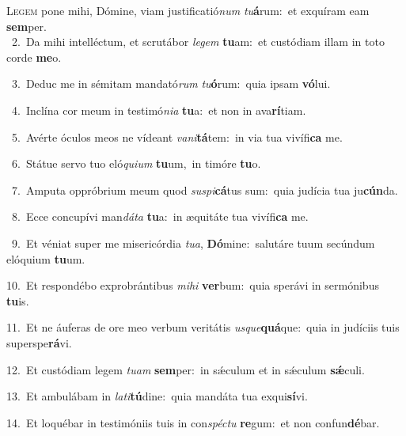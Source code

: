 \lettrine{\initial\textcolor{\initialcolor}{L}}{egem} pone mihi, Dómine, viam justificatió\textit{num} \textit{tu}\-\textbf{á}rum:~\star et exquíram eam \textbf{sem}\-per.\\
{\numbfont\textcolor{\numbcolor}{~2.}}~Da mihi intelléctum, et scrutábor \textit{le}\-\textit{gem} \textbf{tu}\-am:~\star et custódiam illam in toto corde \textbf{me}\-o.\par
{\numbfont\textcolor{\numbcolor}{~3.}}~Deduc me in sémitam mandató\textit{rum} \textit{tu}\-\textbf{ó}rum:~\star quia ipsam \textbf{vó}\-lui.\par
{\numbfont\textcolor{\numbcolor}{~4.}}~Inclína cor meum in testimó\-\textit{ni}\-\textit{a} \textbf{tu}\-a:~\star et non in ava\-\textbf{rí}\-tiam.\par
{\numbfont\textcolor{\numbcolor}{~5.}}~Avérte óculos meos ne vídeant \textit{va}\-\textit{ni}\textbf{tá}tem:~\star in via tua vivífi\textbf{ca} me.\par
{\numbfont\textcolor{\numbcolor}{~6.}}~Státue servo tuo eló\-\textit{qui}\-\textit{um} \textbf{tu}\-um,~\star in timóre \textbf{tu}\-o.\par
{\numbfont\textcolor{\numbcolor}{~7.}}~Amputa oppróbrium meum quod \textit{su}\-\textit{spi}\textbf{cá}tus sum:~\star quia judícia tua ju\-\textbf{cún}\-da.\par
{\numbfont\textcolor{\numbcolor}{~8.}}~Ecce concupívi man\-\textit{dá}\-\textit{ta} \textbf{tu}\-a:~\star in æquitáte tua vivífi\textbf{ca} me.\par
{\numbfont\textcolor{\numbcolor}{~9.}}~Et véniat super me misericórdia \textit{tu}\-\textit{a}, \textbf{Dó}\-mine:~\star salutáre tuum secúndum elóquium \textbf{tu}\-um.\par
{\numbfont\textcolor{\numbcolor}{10.}}~Et respondébo exprobrántibus \textit{mi}\-\textit{hi} \textbf{ver}\-bum:~\star quia sperávi in sermónibus \textbf{tu}\-is.\par
{\numbfont\textcolor{\numbcolor}{11.}}~Et ne áuferas de ore meo verbum veritátis \textit{us}\-\textit{que}\textbf{quá}que:~\star quia in judíciis tuis superspe\-\textbf{rá}\-vi.\par
{\numbfont\textcolor{\numbcolor}{12.}}~Et custódiam legem \textit{tu}\-\textit{am} \textbf{sem}\-per:~\star in sǽculum et in sǽculum \textbf{sǽ}\-culi.\par
{\numbfont\textcolor{\numbcolor}{13.}}~Et ambulábam in \textit{la}\-\textit{ti}\textbf{tú}dine:~\star quia mandáta tua exqui\-\textbf{sí}\-vi.\par
{\numbfont\textcolor{\numbcolor}{14.}}~Et loquébar in testimóniis tuis in con\-\textit{spéc}\-\textit{tu} \textbf{re}\-gum:~\star et non confun\-\textbf{dé}\-bar.\par
